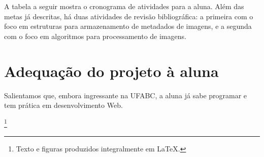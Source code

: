 \documentclass{article}
\newcommand\blfootnote[1]{%
  \begingroup
  \renewcommand\thefootnote{}\footnote{#1}%
  \addtocounter{footnote}{-1}%
  \endgroup
}
\begin{document}
A tabela a seguir mostra o cronograma de atividades para a aluna. Além
das metas já descritas, há duas atividades de revisão bibliográfica: a
primeira com o foco em estruturas para armazenamento de metadados de
imagens, e a segunda com o foco em algoritmos para processamento de
imagens.

\begin{center}
\end{center}


\section{Adequação do projeto à aluna}

Salientamos que, embora ingressante na UFABC, a aluna já sabe
programar e tem prática em desenvolvimento Web.

\printbibliography

\blfootnote{Texto e figuras produzidos integralmente em \LaTeX.}
\end{document}
